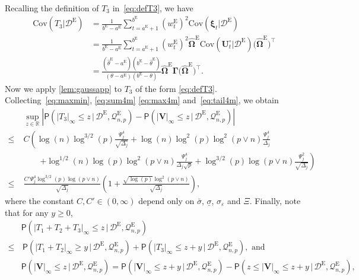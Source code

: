 \documentclass[11pt, a4paper]{article}
\newcommand{\mbf}{\mathbf}
\newcommand{\mc}{\mathcal}
\newcommand{\vep}{\varepsilon}
\renewcommand{\l}{\left}
\renewcommand{\r}{\right}
\def\wh{\widehat}
\newcommand{\cp}{\theta}
\newcommand{\p}{\mathsf{P}}
\newcommand{\R}{\mathbb{R}}
\newcommand{\nn}{\nonumber}
\newcommand{\tE}{\text{E}}
\theoremstyle{definition}
\theoremstyle{definition}
\theoremstyle{definition}
\theoremstyle{definition}
\theoremstyle{definition}
\theoremstyle{remark}
\theoremstyle{definition}
\theoremstyle{definition}
\theoremstyle{definition}
\begin{document}
Recalling the definition of $T_3$ in~\eqref{eq:defT3}, we have 
\begin{align*}
\mathrm{Cov}(T_3 \big\vert\mc D^{\tE}) & = \frac{1}{b^{\tE} - a^{\tE}} \sum_{t = a^{\tE} + 1}^{b^{\tE}} (w^{\tE}_t)^2\mathrm{Cov}(\bm\xi_t \big\vert \mc D^{\tE}) 
\\
& = \frac{1}{b^{\tE} - a^{\tE}} \sum_{t = a^{\tE} + 1}^{b^{\tE}} (w^{\tE}_t)^2\wh{\bm\Omega}^{\tE} \mathrm{Cov}(\mbf U^{\circ}_t\big\vert \mc D^{\tE}) \bigl(\wh{\bm\Omega}^{\tE}\bigr)^{\top}
\\
& = \frac{(\wh{\cp}^{\tE} - a^{\tE})(b^{\tE} - \wh{\cp}^{\tE})}{(\cp - a^{\tE})(b^{\tE} - \cp)}\wh{\bm\Omega}^{\tE}{\bm\Gamma}\bigl(\wh{\bm\Omega}^{\tE}\bigr)^{\top}.
\end{align*}
Now we apply \cref{lem:gaussapp} to $T_3$ of the form \eqref{eq:defT3}.
Collecting~\eqref{eq:maxmin}, \eqref{eq:sum4m} \eqref{eq:max4m} and~\eqref{eq:tail4m}, we obtain 
\begin{align}
& \sup_{z \in \R} \l\vert \p\l( \vert T_3 \vert_\infty \le z \,\big\vert\, \mc D^{\tE}, \mc Q^{\tE}_{n, p} \r) - \p\l( \vert \mbf V \vert_\infty \le z \,\big\vert\, \mc D^{\tE}, \mc Q^{\tE}_{n, p} \r) \r\vert 
\nn \\
\le \;& C\l( \log(n)\log^{3/2}(p)\frac{\Psi_j^4}{\sqrt{\Delta_j}} + \log(n)\log^2(p)\log^2(p\vee n)\frac{\Psi_j^4}{{\Delta_j}} \r. 
\nn \\
& \qquad \l. + \log^{1/2}(n)\log(p)\log^2(p \vee n)\frac{\Psi_j^4}{\Delta_j\sqrt{p}} + \log^{3/2}(p)\log(p \vee n)\frac{\Psi_j^2}{\sqrt{\Delta_j}} \r) 
\nn \\
\le \; & \frac{C' \Psi_j^4 \log^{3/2}(p) \log(p \vee n)}{\sqrt{\Delta_j}} \l( 1 + \frac{\sqrt{\log(p)}\log^2(p \vee n)}{\sqrt{\Delta_j}} \r),
\label{eq:t3:approx}
\end{align}
where the constant $C, C' \in (0, \infty)$ depend only on $\bar{\sigma}$, $\underline{\sigma}$, $\sigma_\vep$ and $\Xi$.
Finally, note that for any $y \ge 0$,
\begin{align*}
& \p\l( \vert T_1 + T_2 + T_3 \vert_\infty \le z \,\big\vert\, \mc D^{\tE}, \mc Q^{\tE}_{n, p} \r) 
\\
\le & \, \p\l( \vert T_1 + T_2 \vert_\infty \ge y \,\big\vert\, \mc D^{\tE}, \mc Q^{\tE}_{n, p} \r) + \p\l( \vert T_3 \vert_\infty \le z + y \,\big\vert\, \mc D^{\tE}, \mc Q^{\tE}_{n, p} \r),
\text{ \ and}
\\
& \p\l( \vert \mbf V \vert_\infty \le z \,\big\vert\, \mc D^{\tE}, \mc Q^{\tE}_{n, p} \r) = \p\l( \vert \mbf V \vert_\infty \le z + y \,\big\vert\, \mc D^{\tE}, \mc Q^{\tE}_{n, p} \r) - \p\l( z \le \vert \mbf V \vert_\infty \le z + y \,\big\vert\, \mc D^{\tE}, \mc Q^{\tE}_{n, p} \r),
\end{align*}
\end{document}
